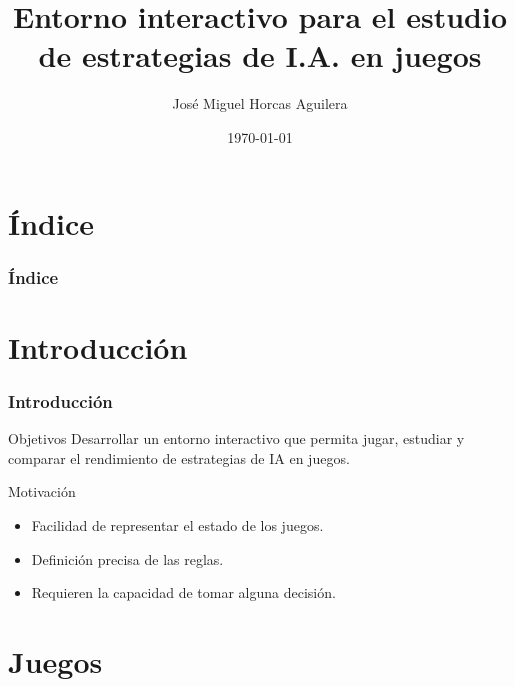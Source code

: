 \documentclass[10pt]{beamer}
\title[Entorno interactivo para el estudio de estrategias de I.A. en juegos]{Entorno interactivo para el estudio de estrategias de I.A. en juegos}
\author{José Miguel Horcas Aguilera}
\date{\today}
\begin{document}

\begin{frame}[plain]
	\titlepage
\end{frame}

\section*{Índice}
\begin{frame}
 \frametitle{Índice}
  \tableofcontents%
\end{frame}

\section{Introducción}
\label{sec:introduccion}


\begin{frame}[t]
\frametitle{Introducción}
\begin{block}{Objetivos}
Desarrollar un entorno interactivo que permita jugar, estudiar y comparar el rendimiento de estrategias de IA en juegos.
\end{block}

\begin{block}{Motivación}
\begin{itemize}
	\item Facilidad de representar el estado de los juegos.
	\item Definición precisa de las reglas.
	\item Requieren la capacidad de tomar alguna decisión.
\end{itemize}
\end{block}

\end{frame}

\section{Juegos}
\end{document}
